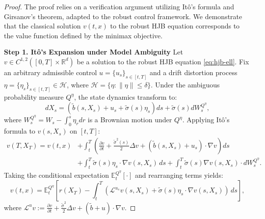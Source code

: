 \documentclass[11pt]{article}
\def\w{\widetilde}
\begin{document}
\begin{proof}
The proof relies on a verification argument utilizing Itô's formula and Girsanov's theorem, adapted to the robust control framework. We demonstrate that the classical solution $v(t,x)$ to the robust HJB equation corresponds to the value function defined by the minimax objective.

\noindent\textbf{Step 1. Itô's Expansion under Model Ambiguity}
Let $v \in C^{1,2}([0,T]\times\mathbb{R}^d)$ be a solution to the robust HJB equation \eqref{eq:hjb-ell}. Fix an arbitrary admissible control $u = \{u_s\}_{s \in [t,T]}$ and a drift distortion process $\eta = \{\eta_s\}_{s \in [t,T]} \in \mathcal{H}$, where $\mathcal{H} = \{ \eta : \|\eta\| \le \delta \}$.
Under the ambiguous probability measure $Q^\eta$, the state dynamics transform to:
\begin{equation}
    dX_s = \left(\w{b}(s, X_s) + u_s + \w{\sigma}(s)\eta_s\right) ds + \w{\sigma}(s) dW_s^{Q^\eta},
\end{equation}
where $W^{Q^\eta}_s = W_s - \int_0^s \eta_r dr$ is a Brownian motion under $Q^\eta$. Applying Itô's formula to $v(s, X_s)$ on $[t, T]$:
\begin{align*}
    v(T, X_T) = v(t, x) &+ \int_t^T \left( \frac{\partial v}{\partial t} + \frac{\w{\sigma}^2(s)}{2}\Delta v + (\w{b}(s,X_s) + u_s)\cdot \nabla v \right) ds \\
    &+ \int_t^T \w{\sigma}(s) \eta_s \cdot \nabla v(s, X_s) \, ds + \int_t^T \w{\sigma}(s) \nabla v(s, X_s) \cdot dW_s^{Q^\eta}.
\end{align*}
Taking the conditional expectation $\mathbb{E}^{Q^\eta}_t[\cdot]$ and rearranging terms yields:
\begin{equation} \label{eq:ito_rep}
    v(t,x) = \mathbb{E}^{Q^\eta}_t \left[ r(X_T) - \int_t^T \left( \mathcal{L}^{u_s} v(s, X_s) + \w{\sigma}(s) \eta_s \cdot \nabla v(s, X_s) \right) \, ds \right],
\end{equation}
where $\mathcal{L}^{u} v := \frac{\partial v}{\partial t} + \frac{\w{\sigma}^2}{2}\Delta v + (\w{b} + u)\cdot \nabla v$.


\end{proof}
\end{document}
